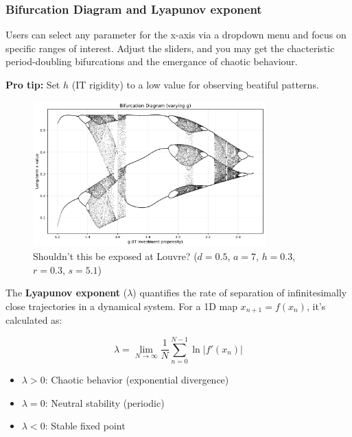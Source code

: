 \documentclass[a4paper, 10pt]{article}
\begin{document}
\subsubsection{Bifurcation Diagram and Lyapunov exponent}
Users can select any parameter for the x-axis via a dropdown menu and focus on specific ranges of interest.
Adjust the sliders, and you may get the chacteristic period-doubling bifurcations and the emergance of chaotic behaviour.

\textbf{Pro tip:} Set $h$ (IT rigidity) to a low value for observing beatiful patterns.

\begin{figure}[H]
	\centering
	\includegraphics[width=0.8\textwidth]{../images/results/big-diagram.pdf}
	\caption{Shouldn't this be exposed at Louvre? ($d = 0.5$, $a = 7$, $h = 0.3$, $r = 0.3$, $s = 5.1$)}
	\label{fig:bifurcation}
\end{figure}

The \textbf{Lyapunov exponent} ($\lambda$) quantifies the rate of separation of infinitesimally close trajectories in a dynamical system. For a 1D map $x_{n+1} = f(x_n)$, it's calculated as:

\begin{equation}
\lambda = \lim_{N \to \infty} \frac{1}{N} \sum_{n=0}^{N-1} \ln |f'(x_n)|
\end{equation}

\begin{itemize}
    \item $\lambda > 0$: Chaotic behavior (exponential divergence)
    \item $\lambda = 0$: Neutral stability (periodic)
    \item $\lambda < 0$: Stable fixed point
\end{itemize}
\end{document}
